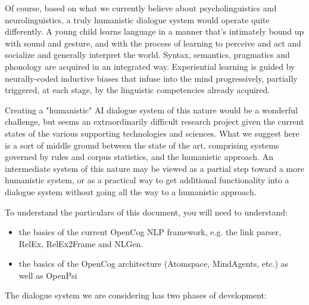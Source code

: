 \documentclass[10pt]{article}
\begin{document}
Of course, based on what we currently believe about psycholinguistics and neurolinguistics, a truly humanistic dialogue system would operate quite differently.   A young child learns language in a manner that's intimately bound up with sound and gesture, and with the process of learning to perceive and act and socialize and generally interpret the world.   Syntax, semantics, pragmatics and phonology are acquired in an integrated way.  Experiential learning is guided by neurally-coded inductive biases that infuse into the mind progressively, partially triggered, at each stage, by the linguistic competencies already acquired.

Creating a "humanistic" AI dialogue system of this nature would be a wonderful challenge, but seems an extraordinarily difficult research project given the current states of the various supporting technologies and sciences.  What we suggest here is a sort of middle ground between the state of the art, comprising systems governed by rules and corpus statistics, and the humanistic approach.  An intermediate system of this nature may be viewed as a partial step toward a more humanistic system, or as a practical way to get additional functionality into a dialogue system without going all the way to a humanistic approach.

To understand the particulars of this document, you will need to understand:

\begin{itemize}
\item the basics of the current OpenCog NLP framework, e.g. the link parser, RelEx, RelEx2Frame and NLGen.
\item the basics of the OpenCog architecture (Atomspace, MindAgents, etc.) as well as OpenPsi
\end{itemize}

The dialogue system we are considering has two phases of development:
\end{document}
